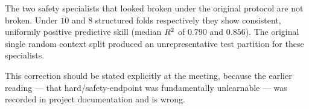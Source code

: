 \begin{findingbox}[title={A revision to an earlier conclusion}]
The two safety specialists that looked broken under the original protocol
are not broken. Under $10$ and $8$ structured folds respectively they show
consistent, uniformly positive predictive skill (median $R^2$ of $0.790$
and $0.856$). The original single random context split produced an
unrepresentative test partition for these specialists.

This correction should be stated explicitly at the meeting, because the
earlier reading --- that hard/safety-endpoint was fundamentally
unlearnable --- was recorded in project documentation and is wrong.
\end{findingbox}
